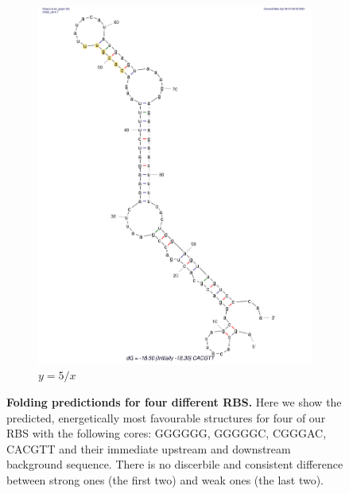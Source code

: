 \begin{figure}
\begin{subfigure}[b]{0.49\textwidth}
         \includegraphics[scale=0.25]{plots/Supplementary/Structure_CACGTT.pdf}
         \caption{$y=5/x$}
         \label{fig:CACGTT}
     \end{subfigure}
        \caption{\textbf{Folding predictionds for four different RBS.} Here we show the predicted, energetically most favourable structures for four of our RBS with the following cores: GGGGGG, GGGGGC, CGGGAC, CACGTT and their immediate upstream and downstream background sequence. There is no discerbile and consistent difference between strong ones (the first two) and weak ones (the last two).}
        \label{fig:structures}
\end{figure}



